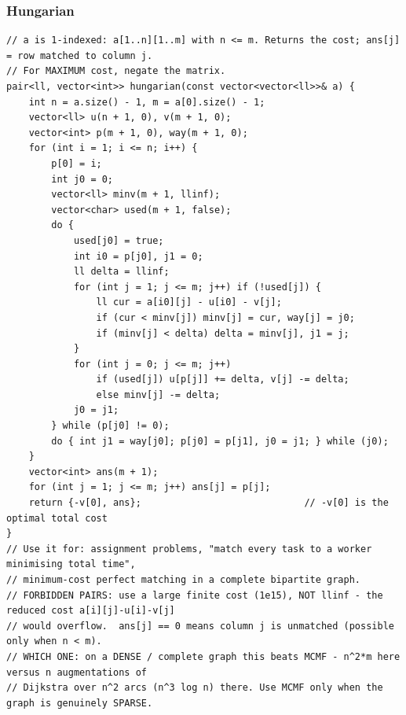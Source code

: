 \documentclass[9pt,a4paper,twocolumn]{extarticle}
\begin{document}
\filbreak
\subsubsection{Hungarian}
\nopagebreak
\begin{lstlisting}
// a is 1-indexed: a[1..n][1..m] with n <= m. Returns the cost; ans[j] = row matched to column j.
// For MAXIMUM cost, negate the matrix.
pair<ll, vector<int>> hungarian(const vector<vector<ll>>& a) {
    int n = a.size() - 1, m = a[0].size() - 1;
    vector<ll> u(n + 1, 0), v(m + 1, 0);
    vector<int> p(m + 1, 0), way(m + 1, 0);
    for (int i = 1; i <= n; i++) {
        p[0] = i;
        int j0 = 0;
        vector<ll> minv(m + 1, llinf);
        vector<char> used(m + 1, false);
        do {
            used[j0] = true;
            int i0 = p[j0], j1 = 0;
            ll delta = llinf;
            for (int j = 1; j <= m; j++) if (!used[j]) {
                ll cur = a[i0][j] - u[i0] - v[j];
                if (cur < minv[j]) minv[j] = cur, way[j] = j0;
                if (minv[j] < delta) delta = minv[j], j1 = j;
            }
            for (int j = 0; j <= m; j++)
                if (used[j]) u[p[j]] += delta, v[j] -= delta;
                else minv[j] -= delta;
            j0 = j1;
        } while (p[j0] != 0);
        do { int j1 = way[j0]; p[j0] = p[j1], j0 = j1; } while (j0);
    }
    vector<int> ans(m + 1);
    for (int j = 1; j <= m; j++) ans[j] = p[j];
    return {-v[0], ans};                             // -v[0] is the optimal total cost
}
// Use it for: assignment problems, "match every task to a worker minimising total time",
// minimum-cost perfect matching in a complete bipartite graph.
// FORBIDDEN PAIRS: use a large finite cost (1e15), NOT llinf - the reduced cost a[i][j]-u[i]-v[j]
// would overflow.  ans[j] == 0 means column j is unmatched (possible only when n < m).
// WHICH ONE: on a DENSE / complete graph this beats MCMF - n^2*m here versus n augmentations of
// Dijkstra over n^2 arcs (n^3 log n) there. Use MCMF only when the graph is genuinely SPARSE.
\end{lstlisting}

\filbreak
\end{document}
